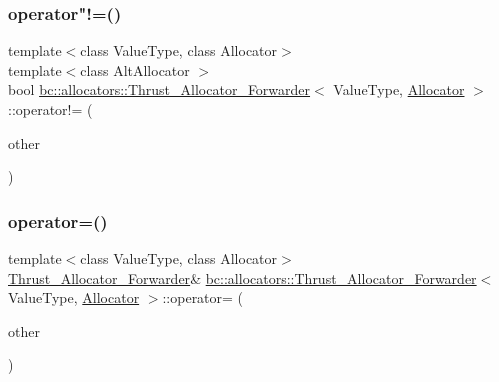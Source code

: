 \mbox{\label{structbc_1_1allocators_1_1Thrust__Allocator__Forwarder_ad1c6787a059e00423c0f763e67300352}} 
\subsubsection{\texorpdfstring{operator"!=()}{operator!=()}}
{\footnotesize\ttfamily template$<$class Value\+Type, class Allocator$>$ \\
template$<$class Alt\+Allocator $>$ \\
bool \hyperlink{structbc_1_1allocators_1_1Thrust__Allocator__Forwarder}{bc\+::allocators\+::\+Thrust\+\_\+\+Allocator\+\_\+\+Forwarder}$<$ Value\+Type, \hyperlink{classbc_1_1allocators_1_1Allocator}{Allocator} $>$\+::operator!= (\begin{DoxyParamCaption}\item[{const Alt\+Allocator \&}]{other }\end{DoxyParamCaption})\hspace{0.3cm}{\ttfamily [inline]}}

\mbox{\label{structbc_1_1allocators_1_1Thrust__Allocator__Forwarder_ad4787c514cb7472361fb3b1f00294e10}} 
\subsubsection{\texorpdfstring{operator=()}{operator=()}\hspace{0.1cm}{\footnotesize\ttfamily [1/2]}}
{\footnotesize\ttfamily template$<$class Value\+Type, class Allocator$>$ \\
\hyperlink{structbc_1_1allocators_1_1Thrust__Allocator__Forwarder}{Thrust\+\_\+\+Allocator\+\_\+\+Forwarder}\& \hyperlink{structbc_1_1allocators_1_1Thrust__Allocator__Forwarder}{bc\+::allocators\+::\+Thrust\+\_\+\+Allocator\+\_\+\+Forwarder}$<$ Value\+Type, \hyperlink{classbc_1_1allocators_1_1Allocator}{Allocator} $>$\+::operator= (\begin{DoxyParamCaption}\item[{const \hyperlink{structbc_1_1allocators_1_1Thrust__Allocator__Forwarder}{Thrust\+\_\+\+Allocator\+\_\+\+Forwarder}$<$ Value\+Type, \hyperlink{classbc_1_1allocators_1_1Allocator}{Allocator} $>$ \&}]{other }\end{DoxyParamCaption})\hspace{0.3cm}{\ttfamily [inline]}}

